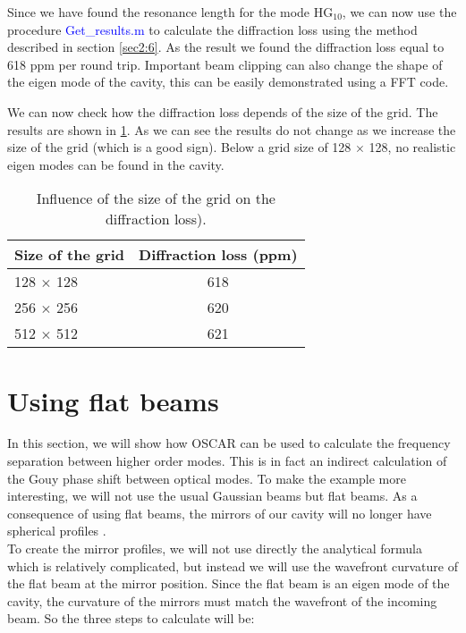 Since we have found the resonance length for the mode HG$_{10}$, we can now use the procedure \textcolor{blue}{Get\_results.m} to calculate the diffraction loss using the method described in section \ref{sec2:6}. As the result we found the diffraction loss equal to 618 ppm per round trip. Important beam clipping can also change the shape of the eigen mode of the cavity, this can be easily demonstrated using a FFT code\cite{Pab}.

We can now check how the diffraction loss depends of the size of the grid. The results are shown in \ref{tab3:grid_size}. As we can see the results do not change as we increase the size of the grid (which is a good sign). Below a grid size of 128 $\times$ 128, no realistic eigen modes can be found in the cavity.

\begin{table}[tbp]
  \centering
  \caption{\label{tab3:grid_size} Influence of the size of the grid on the diffraction loss).}
\begin{tabular}{|l|c|}
\hline
{\large\strut} Size of the grid  & Diffraction loss (ppm) \\
\hline
{\large\strut} 128 $\times$ 128 &  618 \\
{\large\strut} 256 $\times$ 256 &  620 \\
{\large\strut} 512 $\times$ 512 &  621 \\
\hline
\end{tabular}
\end{table}



\section{Using flat beams}
\label{cha3.3}

In this section, we will show how OSCAR can be used to calculate the frequency separation between higher order modes. This is in fact an indirect calculation of the Gouy phase shift between optical modes. To make the example more interesting, we will not use the usual Gaussian beams but flat beams. As a consequence of using flat beams, the mirrors of our cavity will no longer have spherical profiles \cite{Flat}.\\

To create the mirror profiles, we will not use directly the analytical formula which is relatively complicated, but instead we will use the wavefront curvature of the flat beam at the mirror position. Since the flat beam is an eigen mode of the cavity, the curvature of the mirrors must match the wavefront of the incoming beam. So the three steps to calculate will be:

